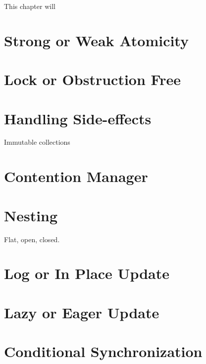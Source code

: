 \makeatletter {}\makeatother
{}
This chapter will
\section{Strong or Weak Atomicity}
\section{Lock or Obstruction Free}
\section{Handling Side-effects}
Immutable collections
\section{Contention Manager}
\section{Nesting}
Flat, open, closed.
\section{Log or In Place Update}
\section{Lazy or Eager Update}
\section{Conditional Synchronization}


\worksheetend